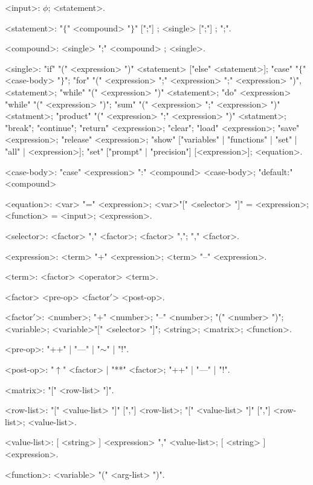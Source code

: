 


\begingrammar
%		
<input>:	{$\phi$};
		<statement>.\par

<statement>:	"$\{$" <compound> "$\}$" [";"] ;
		<single> [";"] ;
		";".

<compound>:	<single> ";" <compound> ;
		<single>.

<single>:	"if" "(" <expression> ")" <statement> ["else" <statement>];
		"case" "$\{$" <case-body> "$\}$";
		"for" "(" <expression> ";" <expression> ";" <expression> ")",
			<statement>;
		"while" "(" <expression> ")" <statement>;
		"do" <expression> "while" "(" <expression> ")";
		"sum" "(" <expression> ";" <expression> ")" <statment>;
		"product" "(" <expression> ";" <expression> ")" <statment>;
		"break";
		"continue";
		"return" <expression>;
		"clear";
		"load" <expression>;
		"save" <expression>;
		"release" <expression>;
		"show" ["variables" | "functions" | "set" | "all" | <expression>];
		"set"  ["prompt" | "precision"] [<expression>];
		<equation>.

<case-body>:	"case" <expression> ":" <compound> <case-body>;
		 "default:" <compound>

<equation>:	<var> "=" <expression>;
		<var>"[" <selector> "]" = <expression>;
		<function> = <input>;
		<expression>.

<selector>:	<factor> "," <factor>;
		<factor> ",";
		"," <factor>.

<expression>:	<term> "+" <expression>;
		<term> "--" <expression>.		

<term>:		<factor> <operator> <term>.

<factor>	<pre-op> <factor$'$> <post-op>.

<factor$'$>:	<number>;
		"+" <number>;
		"--" <number>;
		"(" <number> ")";
		<variable>;
		<variable>"[" <selector> "]";
		<string>;
		<matrix>;
		<function>.

<pre-op>:	"++" | "--{\kern 1pt}--" | "$\sim$" | "!".

<post-op>:	"$\uparrow$" <factor> 
		| "**" <factor>;
		"++" | "--{\kern 1pt}--" | "!".		

<matrix>:	"[" <row-list> "]".

<row-list>:	"[" <value-list> "]" [","] <row-list>;
		"[" <value-list> "]" [","] <row-list>;
		<value-list>.

<value-list>:	[ <string> ] <expression> "," <value-list>;
		[ <string> ] <expression>.

<function>:	<variable> "(" <arg-list> ")".

